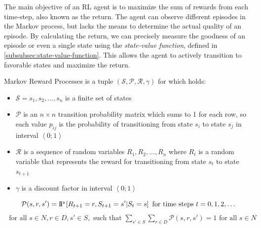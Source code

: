 \documentclass[../xlapes02]{subfiles}
\begin{document}
    The main objective of an RL agent is to maximize the sum of rewards from each time-step, also known as the return. The agent can observe different episodes in the Markov process, but lacks the means to determine the actual quality of an episode. By calculating the return, we can precisely measure the goodness of an episode or even a single state using the \emph{state-value function}, defined in \cref{subsubsec:state-value-function}. This allows the agent to actively transition to favorable states and maximize the return.



    \begin{definition}
        Markov Reward Processes is a tuple $(\mathcal{S}, \mathcal{P}, \mathcal{R}, \gamma)$ for which holds:\cite{rao2022foundations}
        \begin{itemize}
            \item $\mathcal{S} = s_1, s_2, ..., s_n$ is a finite set of states
            \item $\mathcal{P}$ is an $n\times n$ transition probability matrix which sums to 1 for each row, so each value $p_{ij}$ is the probability of transitioning from state $s_i$ to state $s_j$ in interval $\left< 0;1 \right>$
            \item $\mathcal{R}$ is a sequence of random variables $R_1, R_2, ..., R_n$ where $R_t$ is a random variable that represents the reward for transitioning from state $s_t$ to state $s_{t+1}$
            \item $\gamma$ is a discount factor in interval $\left< 0;1 \right>$
        \end{itemize}
        \begin{equation}
            \mathcal{P}(s,r,s') = \text{I\kern-0.15em P}\left[ R_{t+1} = r, S_{t+1} = s' | S_t = s \right] \text{ for time steps } t = 0, 1, 2, \ldots
        \end{equation}
        \begin{align*}
            \text{ for all } s \in N, r \in D, s' \in S, \text{ such that } \sum_{s' \in S} \sum_{r \in D} \mathcal{P}(s,r,s') = 1 \text{ for all } s \in N
        \end{align*}
    \end{definition}
\end{document}
